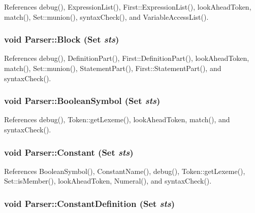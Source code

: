 References debug(), ExpressionList(), First::ExpressionList(), lookAheadToken, match(), Set::munion(), syntaxCheck(), and VariableAccessList().

\hypertarget{classParser_a4d583a4596c19faf368265ec1948a42e}{
\subsubsection[{Block}]{\setlength{\rightskip}{0pt plus 5cm}void Parser::Block ({\bf Set} {\em sts})}}
\label{classParser_a4d583a4596c19faf368265ec1948a42e}


References debug(), DefinitionPart(), First::DefinitionPart(), lookAheadToken, match(), Set::munion(), StatementPart(), First::StatementPart(), and syntaxCheck().

\hypertarget{classParser_aa4a37b37b244053459fad1a82c7d9491}{
\subsubsection[{BooleanSymbol}]{\setlength{\rightskip}{0pt plus 5cm}void Parser::BooleanSymbol ({\bf Set} {\em sts})}}
\label{classParser_aa4a37b37b244053459fad1a82c7d9491}


References debug(), Token::getLexeme(), lookAheadToken, match(), and syntaxCheck().

\hypertarget{classParser_aa1a1fb5ff017a1b3fbaabf63033586fa}{
\subsubsection[{Constant}]{\setlength{\rightskip}{0pt plus 5cm}void Parser::Constant ({\bf Set} {\em sts})}}
\label{classParser_aa1a1fb5ff017a1b3fbaabf63033586fa}


References BooleanSymbol(), ConstantName(), debug(), Token::getLexeme(), Set::isMember(), lookAheadToken, Numeral(), and syntaxCheck().

\hypertarget{classParser_abb393c5891c5a48e7be396bb6249ee4b}{
\subsubsection[{ConstantDefinition}]{\setlength{\rightskip}{0pt plus 5cm}void Parser::ConstantDefinition ({\bf Set} {\em sts})}}
\label{classParser_abb393c5891c5a48e7be396bb6249ee4b}


